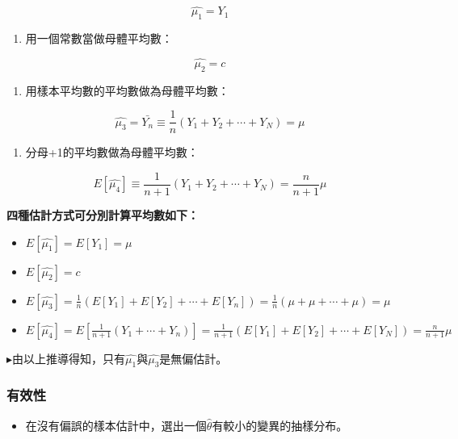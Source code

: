 \documentclass[hyperref,]{ctexart}
\providecommand{\tightlist}{%
  \setlength{\itemsep}{0pt}\setlength{\parskip}{0pt}}
\begin{document}
\[\hat{\mu_{1}}=Y_{1}\]

\begin{enumerate}
\def\labelenumi{\arabic{enumi}.}
\setcounter{enumi}{1}
\tightlist
\item
  用一個常數當做母體平均數：
\end{enumerate}

\[\hat{\mu_{2}}=c\]

\begin{enumerate}
\def\labelenumi{\arabic{enumi}.}
\setcounter{enumi}{2}
\tightlist
\item
  用樣本平均數的平均數做為母體平均數：
\end{enumerate}

\[\hat{\mu_{3}}=\bar{Y_{n}}\equiv \frac{1}{n}(Y_{1}+Y_{2}+\cdots +Y_{N})=\mu\]

\begin{enumerate}
\def\labelenumi{\arabic{enumi}.}
\setcounter{enumi}{3}
\tightlist
\item
  分母+1的平均數做為母體平均數：
\end{enumerate}

\[E[\hat{\mu_{4}}]\equiv \frac{1}{n+1}(Y_{1}+Y_{2}+\cdots +Y_{N})=\frac{n}{n+1}\mu\]

\textbf{四種估計方式可分別計算平均數如下：}

\begin{itemize}
\tightlist
\item
  \(E[\hat{\mu_{1}}]=E[Y_{1}]=\mu\)
\item
  \(E[\hat{\mu_{2}}]=c\)
\item
  \(E[\hat{\mu_{3}}]=\frac{1}{n}(E[Y_{1}]+E[Y_{2}]+\cdots +E[Y_{n}])=\frac{1}{n}(\mu+\mu+\cdots +\mu)=\mu\)
\item
  \(E[\hat{\mu_{4}}]=E[\frac{1}{n+1}(Y_{1}+\cdots +Y_{n})]=\frac{1}{n+1}(E[Y_{1}]+E[Y_{2}]+\cdots +E[Y_{N}])=\frac{n}{n+1}\mu\)
\end{itemize}

\(\blacktriangleright\)由以上推導得知，只有\(\hat{\mu_{1}}\)與\(\hat{\mu_{3}}\)是無偏估計。

\hypertarget{ux6709ux6548ux6027}{%
\subsubsection{有效性}\label{ux6709ux6548ux6027}}

\begin{itemize}
\tightlist
\item
  在沒有偏誤的樣本估計中，選出一個\(\hat{\theta}\)有較小的變異的抽樣分布。
\end{itemize}
\end{document}
